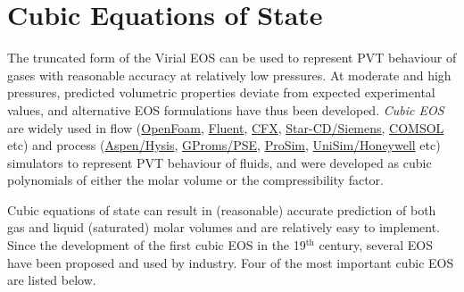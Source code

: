 \begin{subequations}
     \end{subequations}


\section{Cubic Equations of State}\label{Chapter:VolumetricPropertiesPureSubstances:Section:CubicEOS}
     The truncated form of the Virial EOS can be used to represent PVT behaviour of gases with reasonable accuracy at relatively low pressures. At moderate and high pressures, predicted volumetric properties deviate from expected experimental values, and alternative EOS formulations have thus been developed. {\it Cubic EOS} are widely used in flow (\eg \href{https://www.openfoam.com/}{OpenFoam}, \href{http://www.ansys.com/Products/Fluids/ANSYS-Fluent}{Fluent}, \href{http://www.ansys.com/en-GB/Solutions/Solutions-by-Application/Fluids}{CFX}, \href{https://mdx.plm.automation.siemens.com/star-cd}{Star-CD/Siemens}, \href{https://www.comsol.com/}{COMSOL} etc) and process (\href{https://www.aspentech.com/products/engineering/aspen-hysys}{Aspen/Hysis}, \href{https://www.psenterprise.com/products/gproms}{GProms/PSE}, \href{http://www.prosim.net/en/index.php}{ProSim}, \href{https://www.honeywellprocess.com/en-US/explore/products/advanced-applications/unisim/pages/default.aspx}{UniSim/Honeywell} etc) simulators to represent PVT behaviour of fluids, and were developed as cubic polynomials of either the molar volume or the compressibility factor.

     Cubic equations of state can result in (reasonable) accurate prediction of both gas and liquid (saturated) molar volumes and are relatively easy to implement. Since the development of the first cubic EOS in the 19$^{\text{th}}$ century, several EOS have been proposed and used by industry. Four of the most important cubic EOS are listed below.
  
